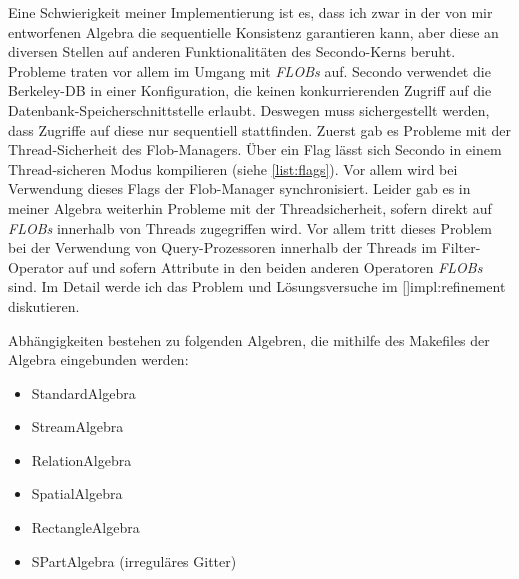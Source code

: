 \documentclass[a4paper,12pt,twoside]{article}
\newcommand{\Fb}[1]{\textit{#1}} %
\begin{document}
Eine Schwierigkeit meiner Implementierung ist es, dass ich zwar in der von mir entworfenen Algebra die sequentielle Konsistenz garantieren kann, aber diese an diversen Stellen auf anderen Funktionalitäten des Secondo-Kerns beruht. Probleme traten vor allem im Umgang mit \Fb{FLOBs} auf. Secondo verwendet die Berkeley-DB in einer Konfiguration, die keinen konkurrierenden Zugriff auf die Datenbank-Speicherschnittstelle erlaubt. Deswegen muss sichergestellt werden, dass Zugriffe auf diese nur sequentiell stattfinden. Zuerst gab es Probleme mit der Thread-Sicherheit des Flob-Managers. Über ein Flag lässt sich Secondo in einem Thread-sicheren Modus kompilieren (siehe \autoref{list:flags}). Vor allem wird bei Verwendung dieses Flags der Flob-Manager synchronisiert. Leider gab es in meiner Algebra weiterhin Probleme mit der Threadsicherheit, sofern direkt auf \Fb{FLOBs} innerhalb von Threads zugegriffen wird. Vor allem tritt dieses Problem bei der Verwendung von Query-Prozessoren innerhalb der Threads im Filter-Operator auf und sofern Attribute in den beiden anderen Operatoren \Fb{FLOBs} sind. Im Detail werde ich das Problem und Lösungsversuche im \autoref{}impl:refinement{} diskutieren.

Abhängigkeiten bestehen zu folgenden Algebren, die mithilfe des Makefiles der Algebra eingebunden werden:

\begin{itemize}
	\item StandardAlgebra
	\item StreamAlgebra
	\item RelationAlgebra
	\item SpatialAlgebra
	\item RectangleAlgebra
	\item SPartAlgebra (irreguläres Gitter)
\end{itemize}
\end{document}
